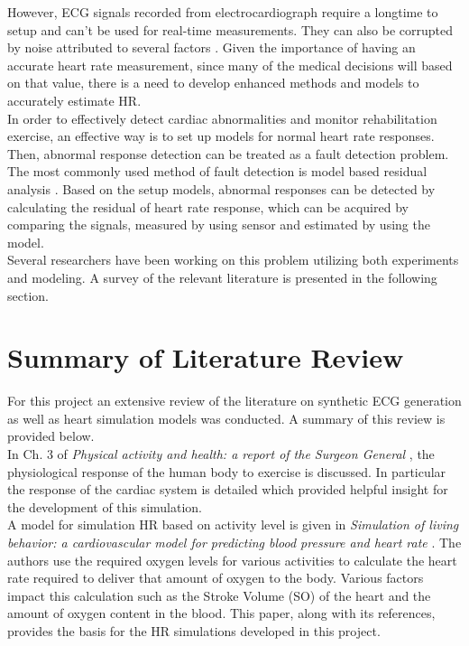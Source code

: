 \documentclass[paper=a4, fontsize=11pt]{scrartcl}
\numberwithin{equation}{section}		%
\numberwithin{figure}{section}			%
\numberwithin{table}{section}		    %
\begin{document}
However, ECG signals recorded from electrocardiograph require a longtime to setup and can't be used 
for real-time measurements. They can also be corrupted by noise attributed to several factors 
\cite{ackora2013artificial}. Given the importance of having an accurate heart rate measurement, 
since many of the medical decisions will based on that value, there is a need to develop enhanced 
methods and models to accurately estimate HR.\\

In order to effectively detect cardiac abnormalities and monitor rehabilitation exercise, an 
effective way is to set up models for normal heart rate responses. Then, abnormal response detection
can be treated as a fault detection problem. The most commonly used method of fault detection is 
model based residual analysis \cite{blanke2003staroswiecki}. Based on the setup models, abnormal 
responses can be detected by calculating the residual of heart rate response, which can be acquired 
by comparing the signals, measured by using sensor and estimated by using the model. \\

Several researchers have been working on this problem utilizing both experiments and modeling. 
A survey of the relevant literature is presented in the following section. \\

\section{Summary of Literature Review}
For this project an extensive review of the literature on synthetic ECG generation as well as heart 
simulation models was conducted. A summary of this review is provided below.\\

In Ch. 3 of \emph{Physical activity and health: a report of the Surgeon General} 
\cite{united1996physical}, the physiological response of the human body to exercise is discussed.
In particular the response of the cardiac system is detailed which provided helpful insight for 
the development of this simulation.\\

A model for simulation HR based on activity level is given in \emph{Simulation of living behavior: 
a cardiovascular model for predicting blood pressure and heart rate} \cite{hotehama2003simulation}.
The authors use the required oxygen levels for various activities to calculate the heart rate 
required to deliver that amount of oxygen to the body. Various factors impact this calculation 
such as the Stroke Volume (SO) of the heart and the amount of oxygen content in the blood. This 
paper, along with its references, provides the basis for the HR simulations developed in this
project.\\
\end{document}
